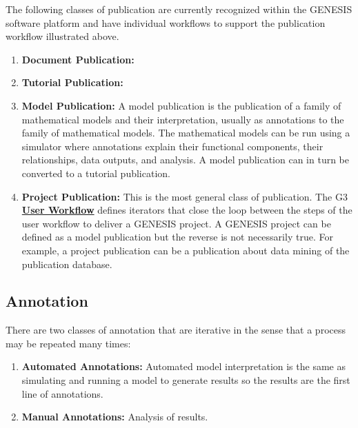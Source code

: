 \documentclass[12pt]{article}
\begin{document}
The following classes of publication are currently recognized within the GENESIS software platform and have individual workflows to support the publication workflow illustrated above.

\begin{enumerate}
   \item {\bf Document Publication:}
   \item {\bf Tutorial Publication:}
   \item {\bf Model Publication:} A model publication is the publication of a family of mathematical models and their interpretation, usually as annotations to the family of mathematical models. The mathematical models can be run using a simulator where annotations explain their functional components, their relationships, data outputs, and analysis. A model publication can in turn be converted to a tutorial publication.
   \item{\bf Project Publication:} This is the most general class of publication. The G3 \href{../workflow-user/workflow-user.tex}{\bf User Workflow} defines iterators that close the loop between the steps of the user workflow to deliver a GENESIS project. A GENESIS project can be defined as  a model publication but the reverse is not necessarily true. For example, a project publication can be a publication about data mining of the publication database.
\end{enumerate}

\subsection*{Annotation}

There are two classes of annotation that are iterative in the sense that a process may be repeated many times:

\begin{enumerate}
   \item {\bf Automated Annotations:} Automated model interpretation is the same as simulating and running a model to generate results so the results are the first line of annotations.
   \item {\bf Manual Annotations:} Analysis of results.
\end{enumerate}
\end{document}
